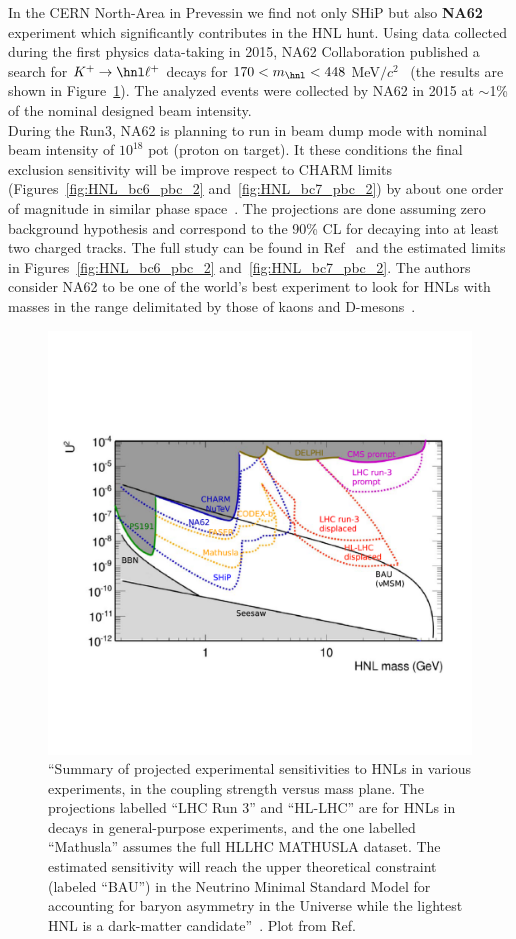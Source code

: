 In the CERN North-Area in Prevessin we find not only SHiP but also
\textbf{NA62}~\cite{Gil_2017} experiment which significantly contributes in
the HNL hunt. Using data 
collected during the first physics data-taking in 2015, NA62
Collaboration published a search for $K^{+} \rightarrow \hnl \ell^{+}$
decays for $170 <m_\hnl< 448$ MeV$/c^{2}$~\cite{Cortina_Gil_2018} (the
results are shown in Figure~\ref{fig:HL_alimena}). The analyzed events
were collected by NA62 in 2015 at $\sim$1\% of the nominal designed
beam intensity.\\
During the Run3, NA62 is planning to run in beam dump mode with
nominal beam intensity of $10^{18}$ pot (proton on target). It these
conditions the final exclusion sensitivity will be improve
respect to CHARM limits (Figures~\ref{fig:HNL_bc6_pbc_2}
and~\ref{fig:HNL_bc7_pbc_2})
by about one order of magnitude in similar phase
space~\cite{na62Drewes_2018}.
The projections are done assuming zero background hypothesis and 
correspond to the 90\% CL for \hnl decaying into at least two
 charged tracks. The full study can be found in
 Ref~\cite{na62Drewes_2018} and the estimated limits in Figures~\ref{fig:HNL_bc6_pbc_2}
and~\ref{fig:HNL_bc7_pbc_2}. The authors consider NA62 to be one of
the world’s best experiment to look for HNLs with masses in the range
delimitated by those of kaons and D-mesons~\cite{na62Drewes_2018}.\\
\begin{figure}[h]
\centering
    \includegraphics[clip,trim=0.5cm 3.5cm 1.cm 4.3cm, width=.78\textwidth]{Figures/c7/projection_alimena.pdf}
\caption{``Summary of projected experimental sensitivities to HNLs in various
experiments, in the coupling strength \mixpar versus mass
plane. The projections labelled ``LHC Run 3'' and ``HL-LHC'' are for HNLs in \PW decays
in general-purpose experiments, and the one labelled ``Mathusla'' assumes the full HLLHC
MATHUSLA dataset. The estimated sensitivity will reach the upper theoretical
constraint (labeled ``BAU'') in the Neutrino Minimal Standard Model
for accounting for baryon asymmetry in the Universe
while the lightest HNL is a dark-matter
candidate''~\cite{PhysRevD.87.093006}. Plot from Ref.~\cite{Alimena_2020}}
\label{fig:HL_alimena}
\end{figure}

